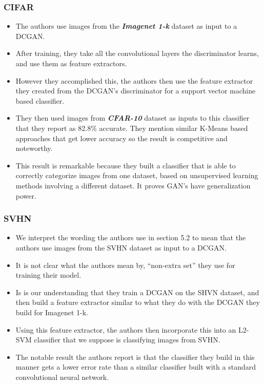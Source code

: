 \documentclass{beamer}
\begin{document}
\begin{frame}
\frametitle{CIFAR}
\begin{itemize}
 \item The authors use images from the \textbf{\textit{Imagenet 1-k}} dataset as input to a DCGAN.
 \item After training, they take all the convolutional layers the discriminator
 learns, and use them as feature extractors. 
 
\item However they accomplished this, the authors then use the feature extractor 
  they created from the DCGAN's discriminator for a support vector machine based
  classifier.
\item They then used images from \textbf{\textit{CFAR-10}} dataset as inputs to this
  classifier that they report as 82.8\% accurate. They mention similar K-Means based
  approaches that get lower accuracy so the result is competitive and noteworthy.
 
\item This result is remarkable because they built a classifier that is able to
  correctly categorize images from one dataset, based on unsupervised learning
  methods involving a different dataset.  It proves GAN's have generalization power.


\end{itemize}
\end{frame}


\begin{frame}
\frametitle{SVHN}
\begin{itemize}
 \item We interpret the wording the authors use in section 5.2 to mean that the
   authors use images from the SVHN dataset as input to a DCGAN.
 \item It is not clear what the authors mean by, ``non-extra set'' they use 
  for training their model.
 \item Is is our understanding that they train a DCGAN on the SHVN dataset, and
  then build a feature extractor similar to what they do with the DCGAN they
  build for Imagenet 1-k.
\item Using this feature extractor, the authors then incorporate this into an
  L2-SVM classifier that we suppose is classifying images from SVHN.
\item The notable result the authors report is that the classifier they build in
  this manner gets a lower error rate than a similar classifier built with a
  standard convolutional neural network.

\end{itemize}
\end{frame}
\end{document}
